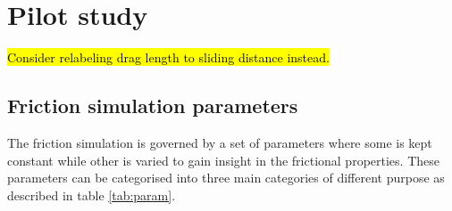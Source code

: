 

\chapter{Pilot study}

\hl{Consider relabeling drag length to sliding distance instead.}

\section{Friction simulation parameters}

The friction simulation is governed by a set of parameters where some is kept constant while other is varied to gain insight in the frictional properties. These parameters can be categorised into three main categories of different purpose as described in table \ref{tab:param}. 


